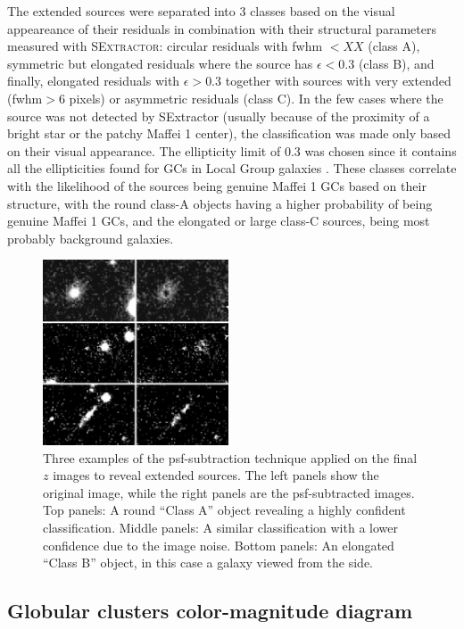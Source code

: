 \documentclass[useAMS,usenatbib]{mn2e}
\begin{document}
{\color{blue} The extended sources were separated into 3 classes based on the visual
appeareance of their residuals in combination with their structural
parameters measured with \textsc{SExtractor}: circular residuals with
fwhm $< XX$ (class A), symmetric but elongated residuals where the
source has $\epsilon< 0.3$ (class B), and finally, elongated residuals
with $\epsilon > 0.3$ together with sources with very extended (fwhm$
> 6$ pixels) or asymmetric residuals (class C). In the few cases where
the source was not detected by SExtractor (usually because of the
proximity of a bright star or the patchy Maffei 1 center), the
classification was made only based on their visual appearance. The
ellipticity limit of 0.3 was chosen since it contains all the
ellipticities found for GCs in Local Group galaxies
\citep[e.g.][]{vdb08}. These classes correlate with the likelihood of
the sources being genuine Maffei 1 GCs based on their structure, with
the round class-A objects having a higher probability of being genuine
Maffei 1 GCs, and the elongated or large class-C sources, being most
probably background galaxies.}

\begin{figure}
\includegraphics[width=0.49\textwidth]{images/Subtracted.jpg}
\caption{Three examples of the psf-subtraction technique applied on the
  final $z$ images to reveal extended sources. The left panels show
  the original image, while the right panels are the psf-subtracted
  images. Top panels: A round ``Class A'' object revealing a highly confident classification. Middle panels: A similar classification with a lower confidence due to the image noise. Bottom panels: An elongated ``Class B'' object, in this case a galaxy viewed from the side.}
\label{fig:subtraction}
\end{figure}

\subsection{Globular clusters color-magnitude diagram}
\label{sec:gc_cmd}
\end{document}
